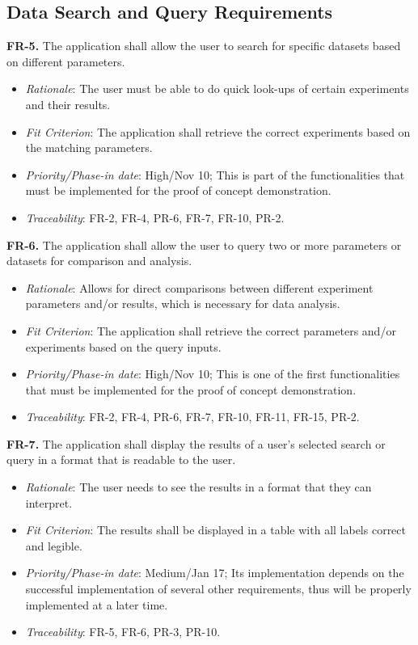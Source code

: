 \documentclass[12pt]{article}
\begin{document}
\subsection{Data Search and Query Requirements}
\textbf{FR-5.} The application shall allow the user to search for specific datasets based on different parameters.
  \begin{itemize}
    \item \textit{Rationale}: The user must be able to do quick look-ups of certain experiments and their results.
    \item \textit{Fit Criterion}: The application shall retrieve the correct experiments based on the matching parameters.
    \item \textit{Priority/Phase-in date}: High/Nov 10; This is part of the functionalities that must be implemented for the proof of concept demonstration.
    \item \textit{Traceability}: FR-2, FR-4, PR-6, FR-7, FR-10, PR-2.
  \end{itemize}
\textbf{FR-6.} The application shall allow the user to query two or more parameters or datasets for comparison and analysis.
  \begin{itemize}
    \item \textit{Rationale}: Allows for direct comparisons between different experiment parameters and/or results, which is necessary for data analysis.
    \item \textit{Fit Criterion}: The application shall retrieve the correct parameters and/or experiments based on the query inputs.
    \item \textit{Priority/Phase-in date}: High/Nov 10; This is one of the first functionalities that must be implemented for the proof of concept demonstration.
    \item \textit{Traceability}: FR-2, FR-4, PR-6, FR-7, FR-10, FR-11, FR-15, PR-2.
  \end{itemize}
\textbf{FR-7.} The application shall display the results of a user’s selected search or query in a format that is readable to the user.
  \begin{itemize}
    \item \textit{Rationale}: The user needs to see the results in a format that they can interpret.
    \item \textit{Fit Criterion}: The results shall be displayed in a table with all labels correct and legible.
    \item \textit{Priority/Phase-in date}: Medium/Jan 17; Its implementation depends on the successful implementation of several other requirements, thus will be properly implemented at a later time.
    \item \textit{Traceability}: FR-5, FR-6, PR-3, PR-10.
  \end{itemize}
\end{document}
